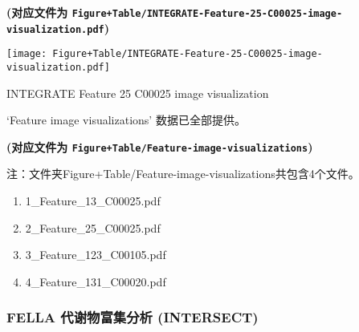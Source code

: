 \documentclass[
]{article}
\providecommand{\tightlist}{%
  \setlength{\itemsep}{0pt}\setlength{\parskip}{0pt}}
\begin{document}
\textbf{(对应文件为 \texttt{Figure+Table/INTEGRATE-Feature-25-C00025-image-visualization.pdf})}

\def\@captype{figure}
\begin{center}
\texttt{[image: Figure+Table/INTEGRATE-Feature-25-C00025-image-visualization.pdf]}
\caption{INTEGRATE Feature 25 C00025 image visualization}\label{fig:INTEGRATE-Feature-25-C00025-image-visualization}
\end{center}

\begin{center}\vspace{1.5cm}\end{center}

\begin{center}\vspace{1.5cm}\end{center}

`Feature image visualizations' 数据已全部提供。

\textbf{(对应文件为 \texttt{Figure+Table/Feature-image-visualizations})}

\begin{center}\begin{tcolorbox}[colback=gray!10, colframe=gray!50, width=0.9\linewidth, arc=1mm, boxrule=0.5pt]注：文件夹Figure+Table/Feature-image-visualizations共包含4个文件。

\begin{enumerate}\tightlist
\item 1\_Feature\_13\_C00025.pdf
\item 2\_Feature\_25\_C00025.pdf
\item 3\_Feature\_123\_C00105.pdf
\item 4\_Feature\_131\_C00020.pdf
\end{enumerate}\end{tcolorbox}
\end{center}

\begin{center}\vspace{1.5cm}\end{center}

\hypertarget{fella-ux4ee3ux8c22ux7269ux5bccux96c6ux5206ux6790-intersect}{%
\subsubsection{FELLA 代谢物富集分析 (INTERSECT)}\label{fella-ux4ee3ux8c22ux7269ux5bccux96c6ux5206ux6790-intersect}}
\end{document}
